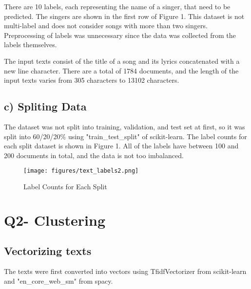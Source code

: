 \documentclass[a4paper,11pt]{article}
\begin{document}
There are 10 labels, each representing the name of a singer, that need to be predicted.
The singers are shown in the first row of Figure 1.
This dataset is not multi-label and does not consider songs with more than two singers.
Preprocessing of labels was unnecessary since the data was collected from the labels themselves.

The input texts consist of the title of a song and its lyrics concatenated with a new line character.
There are a total of 1784 documents, and the length of the input texts varies from 305 characters to 13102 characters.



\subsection{c) Spliting Data}
The dataset was not split into training, validation, and test set at first, 
so it was split into 60/20/20\% using "train\_test\_split" of scikit-learn.
The label counts for each split dataset is shown in Figure 1.
All of the labels have between 100 and 200 documents in total, and the data is not too imbalanced.

\begin{figure}[htbp]
  \begin{center}
  \texttt{[image: figures/text\_labels2.png]}
  \caption{Label Counts for Each Split}
  \end{center}
\end{figure}

\section{Q2- Clustering}
\subsection{Vectorizing texts}
The texts were first converted into vectors using TfidfVectorizer from scikit-learn and "en\_core\_web\_sm" from spacy.
\end{document}
